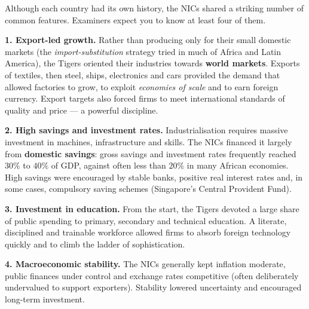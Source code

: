 \documentclass[11pt]{article}
\begin{document}
Although each country had its own history, the NICs shared a striking number of common features. Examiners expect you to know at least four of them.

\textbf{1. Export-led growth.} Rather than producing only for their small domestic markets (the \emph{import-substitution} strategy tried in much of Africa and Latin America), the Tigers oriented their industries towards \textbf{world markets}. Exports of textiles, then steel, ships, electronics and cars provided the demand that allowed factories to grow, to exploit \emph{economies of scale} and to earn foreign currency. Export targets also forced firms to meet international standards of quality and price — a powerful discipline.

\textbf{2. High savings and investment rates.} Industrialisation requires massive investment in machines, infrastructure and skills. The NICs financed it largely from \textbf{domestic savings}: gross savings and investment rates frequently reached $30\%$ to $40\%$ of GDP, against often less than $20\%$ in many African economies. High savings were encouraged by stable banks, positive real interest rates and, in some cases, compulsory saving schemes (Singapore's Central Provident Fund).

\textbf{3. Investment in education.} From the start, the Tigers devoted a large share of public spending to primary, secondary and technical education. A literate, disciplined and trainable workforce allowed firms to absorb foreign technology quickly and to climb the ladder of sophistication.

\textbf{4. Macroeconomic stability.} The NICs generally kept inflation moderate, public finances under control and exchange rates competitive (often deliberately undervalued to support exporters). Stability lowered uncertainty and encouraged long-term investment.
\end{document}
